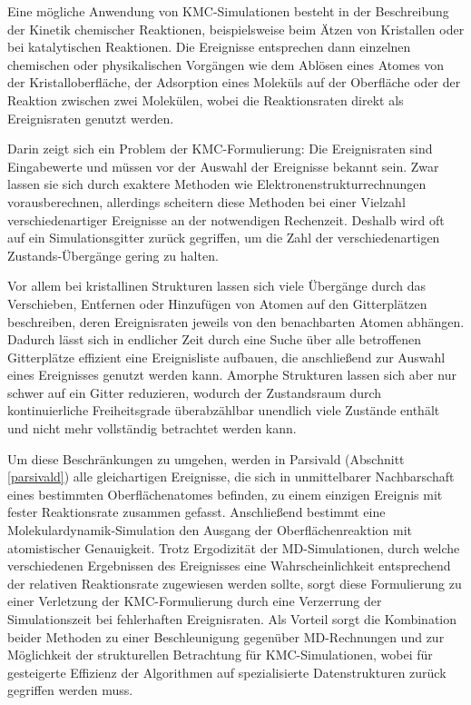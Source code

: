 Eine mögliche Anwendung von KMC-Simulationen besteht in der Beschreibung der Kinetik chemischer Reaktionen, beispielsweise beim Ätzen von Kristallen oder bei katalytischen Reaktionen.
Die Ereignisse entsprechen dann einzelnen chemischen oder physikalischen Vorgängen wie dem Ablösen eines Atomes von der Kristalloberfläche, der Adsorption eines Moleküls auf der Oberfläche oder der Reaktion zwischen zwei Molekülen, wobei die Reaktionsraten direkt als Ereignisraten genutzt werden.

Darin zeigt sich ein Problem der KMC-Formulierung:
Die Ereignisraten sind Eingabewerte und müssen vor der Auswahl der Ereignisse bekannt sein.
Zwar lassen sie sich durch exaktere Methoden wie Elektronenstrukturrechnungen vorausberechnen, allerdings scheitern diese Methoden bei einer Vielzahl verschiedenartiger Ereignisse an der notwendigen Rechenzeit.
Deshalb wird oft auf ein Simulationsgitter zurück gegriffen, um die Zahl der verschiedenartigen Zustands-Übergänge gering zu halten.

Vor allem bei kristallinen Strukturen lassen sich viele Übergänge durch das Verschieben, Entfernen oder Hinzufügen von Atomen auf den Gitterplätzen beschreiben, deren Ereignisraten jeweils von den benachbarten Atomen abhängen.
Dadurch lässt sich in endlicher Zeit durch eine Suche über alle betroffenen Gitterplätze effizient eine Ereignisliste aufbauen, die anschließend zur Auswahl eines Ereignisses genutzt werden kann.
Amorphe Strukturen lassen sich aber nur schwer auf ein Gitter reduzieren, wodurch der Zustandsraum durch kontinuierliche Freiheitsgrade überabzählbar unendlich viele Zustände enthält und nicht mehr vollständig betrachtet werden kann.

Um diese Beschränkungen zu umgehen, werden in Parsivald (Abschnitt \ref{parsivald}) alle gleichartigen Ereignisse, die sich in unmittelbarer Nachbarschaft eines bestimmten Oberflächenatomes befinden, zu einem einzigen Ereignis mit fester Reaktionsrate zusammen gefasst.
Anschließend bestimmt eine Molekulardynamik-Simulation den Ausgang der Oberflächenreaktion mit atomistischer Genauigkeit.
Trotz Ergodizität der MD-Simulationen, durch welche verschiedenen Ergebnissen des Ereignisses eine Wahrscheinlichkeit entsprechend der relativen Reaktionsrate zugewiesen werden sollte, sorgt diese Formulierung zu einer Verletzung der KMC-Formulierung durch eine Verzerrung der Simulationszeit bei fehlerhaften Ereignisraten.
Als Vorteil sorgt die Kombination beider Methoden zu einer Beschleunigung gegenüber MD-Rechnungen und zur Möglichkeit der strukturellen Betrachtung für KMC-Simulationen, wobei für gesteigerte Effizienz der Algorithmen auf spezialisierte Datenstrukturen zurück gegriffen werden muss.

